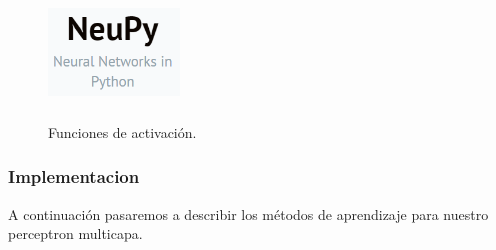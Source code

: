 \documentclass[12pt]{article}
\newcounter{subsubsubsection}[subsubsection]
\begin{document}
\begin{figure}[h]
\includegraphics[width=3.5cm, height=3.5cm]{neupy}
\centering
\caption{Funciones de activación.}
\label{fig:FUNCACT}
\end{figure}

\subsubsection{Implementacion}
A continuación pasaremos a describir los métodos de aprendizaje para nuestro perceptron multicapa.
\end{document}
